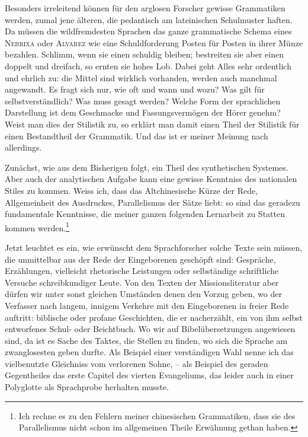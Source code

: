 Besonders irreleitend können für den arglosen Forscher gewisse Grammatiken werden, zumal jene älteren, die pedantisch am lateinischen Schulmuster haften. Da müssen die wildfremdesten Sprachen das ganze grammatische Schema eines \textsc{Nebrixa} oder \textsc{Alvarez} wie eine Schuldforderung Posten für Posten in ihrer Münze bezahlen. Schlimm, wenn sie einen schuldig bleiben; bestreiten sie aber einen doppelt und dreifach, so ernten sie hohes Lob. Dabei geht Alles sehr ordentlich und ehrlich zu: die Mittel sind wirklich vorhanden, werden auch manchmal angewandt. Es fragt sich nur, wie oft und wann und wozu? Was gilt für selbstverständlich? Was muss gesagt werden? Welche Form der sprachlichen Darstellung ist dem Geschmacke und Fassungsvermögen der Hörer genehm? Weist man dies der Stilistik zu, so erklärt man damit einen Theil der Stilistik für einen Bestand\-theil der Grammatik. Und das ist er meiner Meinung nach allerdings.

Zunächst, wie aus dem Bisherigen folgt, ein Theil des synthetischen Systemes. Aber auch der analytischen Aufgabe kann eine gewisse Kenntniss des nationalen Stiles zu  kommen. Weiss ich, dass das Altchinesische Kürze der Rede, Allgemeinheit des Ausdruckes, Parallelis\label{fp.111}mus der Sätze liebt: so sind das geradezu fundamentale Kenntnisse, die meiner ganzen folgenden Lernarbeit zu Statten kommen werden.\footnote{Ich rechne es zu den Fehlern meiner chinesischen Grammatiken, dass sie des Parallelismus nicht schon im allgemeinen Theile Erwähnung gethan haben.}

Jetzt leuchtet es ein, wie erwünscht dem Sprachforscher solche Texte sein müssen, die unmittelbar aus der Rede der Eingeborenen geschöpft sind: Gespräche, Erzählungen, vielleicht rhetorische Leistungen oder selbständige schriftliche Versuche schreibkundiger Leute. Von den Texten der Missionsliteratur aber dürfen wir unter sonst gleichen Umständen denen den Vorzug geben, wo der Verfasser nach langem, innigem Verkehre mit den Eingeborenen in freier Rede auftritt: biblische oder profane Geschichten, die er nacherzählt, ein von ihm selbst entworfenes Schul- oder Beichtbuch. Wo wir auf Bibelübersetzungen angewiesen sind, da ist es Sache des Taktes, die Stellen zu finden, wo sich die Sprache am zwanglosesten geben durfte. Als Beispiel einer verständigen Wahl nenne ich das vielbenutzte Gleichniss vom verlorenen Sohne, – als Beispiel des geraden Gegentheiles das erste Capitel des vierten Evangeliums, das leider auch in einer Polyglotte als Sprachprobe herhalten musste.

